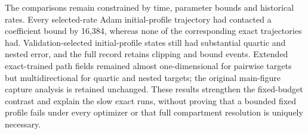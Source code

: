 The comparisons remain constrained by time, parameter bounds and historical rates. Every selected-rate Adam initial-profile trajectory had contacted a coefficient bound by 16,384, whereas none of the corresponding exact trajectories had. Validation-selected initial-profile states still had substantial quartic and nested error, and the full record retains clipping and bound events. Extended exact-trained path fields remained almost one-dimensional for pairwise targets but multidirectional for quartic and nested targets; the original main-figure capture analysis is retained unchanged. These results strengthen the fixed-budget contrast and explain the slow exact runs, without proving that a bounded fixed profile fails under every optimizer or that full compartment resolution is uniquely necessary.
